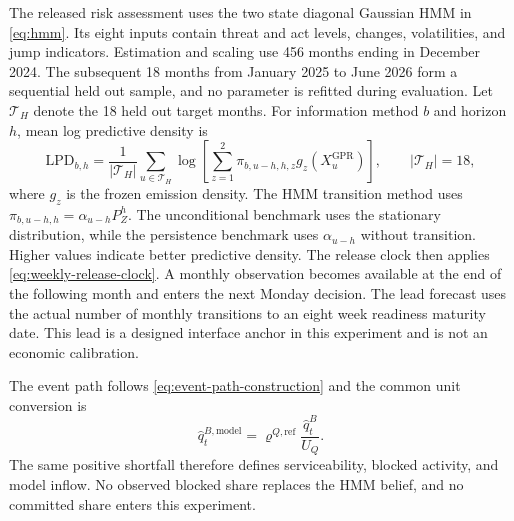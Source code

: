 \documentclass[a4paper,fleqn]{cas-sc}
\begin{document}
The released risk assessment uses the two state diagonal Gaussian HMM in
\cref{eq:hmm}. Its eight inputs contain threat and act levels, changes,
volatilities, and jump indicators. Estimation and scaling use 456 months ending
in December 2024. The subsequent 18 months from January 2025 to June 2026 form
a sequential held out sample, and no parameter is refitted during evaluation.
Let $\mathcal T_H$ denote the 18 held out target months. For information method
$b$ and horizon $h$, mean log predictive density is
\begin{equation}
 \mathrm{LPD}_{b,h}=\frac{1}{|\mathcal T_H|}
 \sum_{u\in\mathcal T_H}
 \log\left[
 \sum_{z=1}^{2}\pi_{b,u-h,h,z}
 g_z\!\left(X^{\mathrm{GPR}}_{u}\right)
 \right],
 \qquad |\mathcal T_H|=18,
 \label{eq:521-heldout-lpd}
\end{equation}
where $g_z$ is the frozen emission density. The HMM transition method uses
$\pi_{b,u-h,h}=\alpha_{u-h}P_Z^h$. The unconditional benchmark uses the
stationary distribution, while the persistence benchmark uses
$\alpha_{u-h}$ without transition. Higher values indicate better predictive
density. The release clock then applies \cref{eq:weekly-release-clock}. A
monthly observation becomes available at the end of the following month and
enters the next Monday decision. The lead forecast uses the actual number of
monthly transitions to an eight week readiness maturity date. This lead is a
designed interface anchor in this experiment and is not an economic
calibration.

The event path follows \cref{eq:event-path-construction} and the common unit
conversion is
\begin{equation}
 \widehat q_t^{B,\mathrm{model}}
 =\varrho^{Q,\mathrm{ref}}
 \frac{\widehat q_t^B}{U_Q}.
 \label{eq:521-model-event-input}
\end{equation}
The same positive shortfall therefore defines serviceability, blocked activity,
and model inflow. No observed blocked share replaces the HMM belief, and no
committed share enters this experiment.
\end{document}
